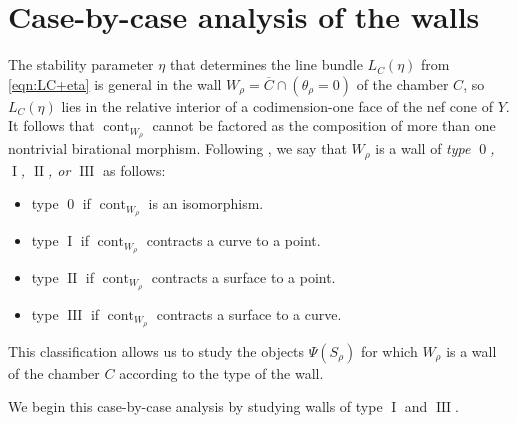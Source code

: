 \documentclass[11pt,reqno]{amsart}
\numberwithin{equation}{section}
\theoremstyle{definition}
\newcommand{\cont}{\operatorname{cont}}
\newcommand{\0}{\operatorname{0}}
\newcommand{\I}{\operatorname{I}}
\newcommand{\II}{\operatorname{II}}
\newcommand{\III}{\operatorname{III}}
\begin{document}
 \section{Case-by-case analysis of the walls}
 The stability parameter $\eta$ that determines the line bundle $L_C(\eta)$ from \eqref{eqn:LC+eta} is general in the wall $W_\rho=\overline{C}\cap (\theta_\rho=0)$ of the chamber $C$, so $L_C(\eta)$ lies in the relative interior of a codimension-one face of the nef cone of $Y$. It follows that $\cont_{W_\rho}$ cannot be factored as the composition of more than one nontrivial birational morphism. Following \cite[Definition~3.5]{CI04}, we say that $W_\rho$ is a wall of \emph{type $\0$, $\I$, $\II$, or $\III$} as follows:
 \begin{itemize}
     \item  type $\0$ if $\cont_{W_\rho}$ is an isomorphism.
     \item type $\I$ if $\cont_{W_\rho}$ contracts a curve to a point.
     \item type $\II$ if $\cont_{W_\rho}$ contracts a surface to a point.
     \item type $\III$ if $\cont_{W_\rho}$ contracts a surface to a curve.
 \end{itemize}
 This classification allows us to study the objects $\Psi(S_\rho)$ for which $W_\rho$ is a wall of the chamber $C$ according to the type of the wall.

 We begin this case-by-case analysis by studying walls of type $\I$ and $\III$.
 
\end{document}
